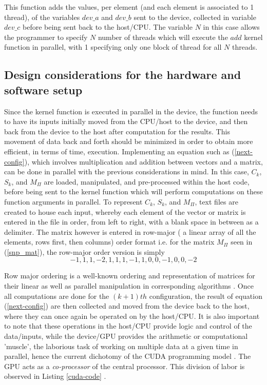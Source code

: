 \documentclass{svmultm}
\begin{document}
This function adds the values, per element (and
each element is associated to 1 thread), of the variables
$dev\_a$ and $dev\_b$ sent to the device, collected in variable
$dev\_c$ before being sent back to the host/CPU. The variable
$N$ in this case allows the programmer to specify $N$ number of
threads which will execute the $add$ kernel function in parallel, with 1
specifying only one block of thread for all $N$ threads.


\subsection{Design considerations for the hardware and software
setup}

Since the kernel function is executed in parallel in
the device, the function needs to have its {inputs}
initially moved from the CPU/host to the device, and then back from the device to the
host after computation { for the results}. This movement of data back and forth should be minimized in order to obtain more efficient,
in terms of time, execution.
Implementing an equation such as (\ref{next-config}), which involves
multiplication and addition between vectors and a matrix,
can be done in parallel with the previous considerations in
mind. In this case, $C_k$, $S_k$, and $M_{\Pi}$ are loaded, manipulated, and pre-processed within the host code,
before being sent to the kernel function which will perform
computations on these function arguments in parallel.
To represent $C_k$, $S_k$, and $M_{\Pi}$, text files are created 
to house each input, whereby each element of the
vector or matrix is entered in the file in order, from left to right, with a blank space in between as a delimiter. The
matrix however is entered in row-major ( a linear array of all
the elements, rows first, then columns) order format i.e. for
the matrix $M_{\Pi}$ seen in (\ref{snp_mat}), the row-major order version is simply
\begin{equation}\label{row-maj}
-1, 1, 1, -2, 1, 1, 1, -1, 1, 0, 0, -1, 0, 0, -2
\end{equation}

Row major ordering is a well-known ordering and
representation of matrices for their linear as well as parallel
manipulation in corresponding algorithms \cite{cudabook}. Once all
computations are done for the $(k+1)th$ configuration, the result of
equation (\ref{next-config}) are then collected and moved from the
device back to the host, where they can once again be
operated on by the host/CPU. It is also important to note
that these operations in the host/CPU provide logic and
control of the data/inputs, while the device/GPU provides
the arithmetic or computational 'muscle', the laborious task
of working on multiple data at a given time in parallel,
hence the current dichotomy of the CUDA programming model \cite{amgpu}. The GPU acts as a \textit{co-processor} of the central processor.
This division of labor is observed in Listing \ref{cuda-code} .
\end{document}
